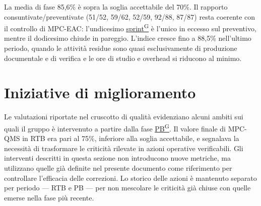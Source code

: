 \documentclass[a4paper,12pt]{article}
\providecommand{\glslink}[2]{\href{https://alittlebyte-19.github.io/Documentazione/glossario.html\#gls-#1}{\underline{#2}\textsuperscript{\scriptsize G}}}
\begin{document}
La media di fase 85,6\% è sopra la soglia accettabile del 70\%. Il rapporto consuntivate/preventivate (51/52, 59/62, 52/59, 92/88, 87/87) resta coerente con il controllo di MPC-EAC: l'undicesimo \glslink{sprint}{sprint} è l'unico in eccesso sul preventivo, mentre il dodicesimo chiude in pareggio. L'indice cresce fino a 88,5\% nell'ultimo periodo, quando le attività residue sono quasi esclusivamente di produzione documentale e di verifica e le ore di studio e overhead si riducono al minimo.

\section{Iniziative di miglioramento}
\label{sec:iniziative-miglioramento}

Le valutazioni riportate nel cruscotto di qualità evidenziano alcuni ambiti sui quali il gruppo è intervenuto a partire dalla fase \glslink{pb-product-baseline}{PB}. Il valore finale di MPC-QMS in RTB era pari al 75\%, inferiore alla soglia accettabile, e segnalava la necessità di trasformare le criticità rilevate in azioni operative verificabili. Gli interventi descritti in questa sezione non introducono nuove metriche, ma utilizzano quelle già definite nel presente documento come riferimento per controllare l'efficacia delle correzioni. Lo storico delle azioni è mantenuto separato per periodo — RTB e PB — per non mescolare le criticità già chiuse con quelle emerse nella fase più recente.
\end{document}
